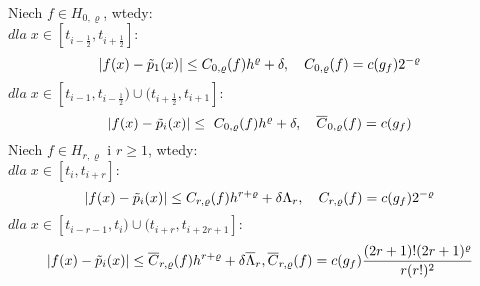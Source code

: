 \documentclass[oik, pdftex, robocza, man]{mgrwms}
\begin{document}
    \begin{lemma} \label{lem:algMP_2}
        Niech $f \in H_{0, \varrho}$, wtedy: \\
        $dla \; x \in [t_{i-\frac{1}{2}}, t_{i + \frac{1}{2}}] :$
        \begin{equation*}
            |f(x) - \tilde{p}_{1}(x)| \leq C_{0, \varrho}(f) h^{\varrho} + \delta, \quad C_{0, \varrho}(f) = c(g_{f}) 2^{-\varrho} \\
        \end{equation*}
        $dla \; x \in [t_{i-1}, t_{i - \frac{1}{2}}) \cup (t_{i + \frac{1}{2}}, t_{i+1}]  :$
        \begin{equation*}
            |f(x) - \tilde{p}_{i}(x)| \leq \ {C} _{0, \varrho}(f) h^{\varrho}  + \delta, \quad \overline{C} _{0, \varrho}(f) = c(g_{f}) \\
        \end{equation*}
        Niech $f \in H_{r, \varrho}$ i $r \geq 1$, wtedy: \\
        $dla \; x \in [t_{i}, t_{i + r}] : $
        \begin{equation*}
            |f(x) - \tilde{p}_{i}(x)| \leq C_{r, \varrho}(f) h^{r+\varrho} + \delta\Lambda_{r}, \quad C_{r, \varrho}(f) = c(g_{f}) 2^{-\varrho} \\
        \end{equation*}
        $dla \; x \in [t_{i-r-1}, t_{i}) \cup (t_{i + r}, t_{i+2r+1}]  :$
        \begin{equation*}
            |f(x) - \tilde{p}_{i}(x)| \leq \overline{C} _{r, \varrho}(f) h^{r+\varrho} + \delta\overline{\Lambda}_{r}, \overline{C} _{r, \varrho}(f) = c(g_{f}) \frac{(2r+1)!(2r+1)^{\varrho}}{r(r!)^{2}} \\
        \end{equation*}
    \end{lemma}
\end{document}

